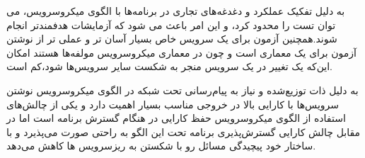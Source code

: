 به دلیل تفکیک عملکرد و دغدغه‌های تجاری در برنامه‌ها با الگوی میکرو‌سرویس، می توان تست را محدود کرد، و این امر باعث می شود که آزمایشات هدفمندتر انجام شوند.همچنین آزمون برای یک سرویس خاص بسیار آسان تر و عملی تر از نوشتن آزمون برای یک معماری  است و چون در معماری میکروسرویس مولفه‌ها  هستند امکان این‌که یک تغییر در یک سرویس منجر به شکست سایر سرویس‌ها شود،کم است.

به دلیل ذات توزیع‌شده و نیاز به پیام‌رسانی تحت شبکه در الگوی میکروسرویس نوشتن سرویس‌ها با کارایی بالا در خروجی مناسب بسیار اهمیت دارد و یکی از چالش‌های استفاده از الگوی میکروسرویس حفظ کارایی در هنگام گسترش برنامه است اما در مقابل چالش کارایی گسترش‌پذیری برنامه تحت این الگو به راحتی صورت می‌پذیرد و با ساختار خود پیچیدگی مسائل رو با شکستن به ریز‌سرویس ها کاهش می‌دهد.
























